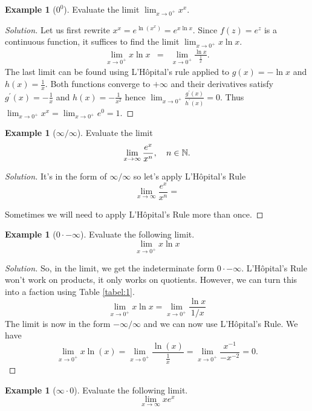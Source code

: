 \documentclass[a4paper]{amsproc}
\theoremstyle{plain}
\numberwithin{equation}{section} %
\numberwithin{figure}{section} %
\theoremstyle{plain}
\theoremstyle{definition}
\newtheorem{example}[thm]{Example}
\theoremstyle{definition}
\theoremstyle{remark}
\begin{document}
\begin{example}[$0^0$]\label{exm:2}
Evaluate the limit \(  \lim_{x\to 0^+}x^x \).
\end{example}

\begin{proof}[Solution]
Let us first rewrite \(  x^x=e^{\ln(x^x)}=e^{x\ln x} \). Since \( f(z)=e^z \) is a continuous function, it suffices to find the limit \(  \lim_{x\to 0^+}x\ln x \).
\begin{eqnarray*}
\lim_{x\to 0^+}x\ln x&=&\lim_{x\to 0^+}\frac{\ln x}{\frac1x}.
\end{eqnarray*}
The last limit can be found using L'H\^{o}pital's rule applied to \( g(x)=-\ln x \) and \( h(x)=\frac1x \). Both functions converge to \( +\infty \) and their derivatives satisfy \( g^{\prime}(x)=-\frac1x \) and \( h(x)=-\frac1{x^2} \) hence \(  \lim_{x\to 0^+}\frac{g^{\prime}(x)}{h^{\prime}(x)}=0 \). Thus \(  \lim_{x\to 0^+}x^x=\lim_{x\to 0^+}e^0=1 \).
\end{proof}

\begin{example}[$\infty/\infty$]\label{exm:3}
Evaluate the limit
\[ \lim_{x\to \infty}\frac{e^x}{x^n},\quad n\in\Bbb{N}.\]
\end{example}

\begin{proof}[Solution]
It's in the form of $\infty/ \infty$ so let's apply L'H\^{o}pital's Rule
\[ \lim_{x\to \infty}\frac{e^x}{x^n}=\]

Sometimes we will need to apply L'H\^{o}pital's Rule more than once.
\end{proof}

\begin{example}[$0\cdot -\infty$]\label{exm:4}
Evaluate the following limit.
\[\lim_{x\to 0^+}x\ln x\]
\end{example}

\begin{proof}[Solution]
So, in the limit, we get the indeterminate form $0\cdot -\infty$. L'H\^{o}pital's Rule won't work on products, it only works on
quotients. However, we can turn this into a faction using Table \ref{tabel:1}.
\[\lim_{x\to 0^+}x\ln x=\lim_{x\to 0^+}\frac{\ln x}{1/x}\]
The limit is now in the form $-\infty/\infty$ and we can now use L'H\^{o}pital's Rule. We have
\[
\lim_{x\to 0^+}{  x\ln(x) } = \lim_{x\to 0^+} \frac{\ln(x)}{\frac{1}{x}} = \lim_{x\to 0^+} \frac{x^{-1}}{-x^{-2}} = 0.
\]
\end{proof}

\begin{example}[$\infty\cdot 0$]\label{exm:5}
Evaluate the following limit.
\[\lim_{x\to \infty}xe^x\]
\end{example}
\end{document}
